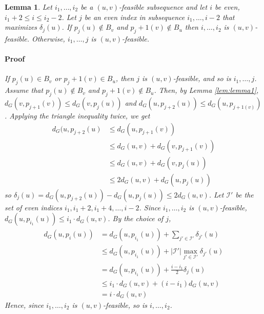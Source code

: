 \documentclass[12pt]{article}
\newtheorem{lem}[thm]{Lemma}
\begin{document}


\begin{lem}
Let $i_1, \hdots, i_2$ be a $(u,v)$-feasible subsequence and let $i$ be even, $i_1+2 \leq i \leq i_2-2$. Let $j$ be an even index in subsequence $i_1, \hdots ,i-2$ that maximizes $\delta_j(u)$. If $p_j(u) \not\in B_v$ and $p_j+1(v) \not\in B_u$ then $i, \hdots , i_2$ is $(u,v)$-feasible. Otherwise, $i_1, \hdots , j$ is $(u,v)$-feasible.

\paragraph{Proof} If $p_j(u) \in B_v$ or $p_j+1(v) \in B_u$, then $j$ is $(u,v)$-feasible, and so is $i_1, \hdots, j$. Assume that $p_j(u) \not\in B_v$ and $p_j+1(v) \not\in B_u$. Then, by Lemma \ref{lem:lemma1}, $d_G(v,p_{j+1}(v)) \leq d_G(v,p_{j}(u))$ and $d_G(u,p_{j+2}(u)) \leq d_G(u,p_{j+1(v)})$. Applying the triangle inequality twice, we get 
\begin{align*}
d_G(u,p_{j+2}(u) &\leq d_G(u,p_{j+1}(v)) \\
&\leq d_G(u,v) + d_G(v, p_{j+1}(v)) \\
&\leq d_G(u,v) + d_G(v, p_{j}(u)) \\
&\leq 2d_G(u,v) + d_G(u, p_{j}(u))
\end{align*}
so $\delta_j(u) = d_G(u,p_{j+2}(u)) - d_G(u,p_j(u)) \leq 2d_G(u,v)$. Let $\mathcal{I}'$ be the set of even indices $i_1, i_1+2, i_1+4, \hdots, i-2$. Since $i_1, \hdots, i_2$ is $(u,v)$-feasible, $d_G(u,p_{i_1}(u)) \leq i_1 \cdot d_G(u,v)$. By the choice of $j$,
\begin{align*}
d_G(u,p_{i}(u)) &= d_G(u,p_{i_1}(u)) + \sum_{j' \in \mathcal{I'}}\delta_{j'}(u) \\
&\leq d_G(u,p_{i_1}(u)) + \left| \mathcal{I'} \right| \max_{j' \in \mathcal{I'}}\delta_{j'}(u) \\
&= d_G(u,p_{i_1}(u)) + \frac{i-i_1}{2} \delta_{j}(u) \\
&\leq i_1 \cdot d_G(u,v) + (i-i_1)d_G(u,v) \\
&= i \cdot d_G(u,v)
\end{align*}
Hence, since $i_1, \hdots, i_2$ is $(u,v)$-feasible, so is $i, \hdots, i_2$.
\end{lem}
\end{document}
